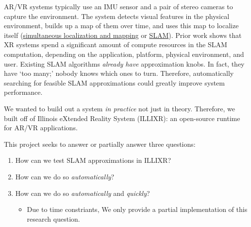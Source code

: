 AR/VR systems typically use an IMU sensor and a pair of stereo cameras to capture the environment. The system detects visual features in the physical environment, builds up a map of them over time, and uses this map to localize itself (\ul{simultaneous localization and mapping} or \ul{SLAM}). Prior work shows that XR systems spend a significant amount of compute resources in the SLAM computation, depending on the application, platform, physical environment, and user\cite{huzaifa2020exploring}. Existing SLAM algorithms \textit{already have} approximation knobs. In fact, they have `too many;' nobody knows which ones to turn. Therefore, automatically searching for feasible SLAM approximations could greatly improve system performance.


We wanted to build out a system \textit{in practice} not just in theory. Therefore, we built off of Illinois eXtended Reality System (ILLIXR): an open-source runtime for AR/VR applications\cite{huzaifa2020exploring}. 

This project seeks to answer or partially answer three questions:

\begin{enumerate}[label={\textbf{R.Q. {\theenumi}}}]
\item How can we test SLAM approximations in ILLIXR?
\item How can we do so \textit{automatically}?
\item How can we do so \textit{automatically} and \textit{quickly}?
  \begin{itemize}
  \item Due to time constriants, We only provide a partial implementation of this research question.
  \end{itemize}
\end{enumerate}
